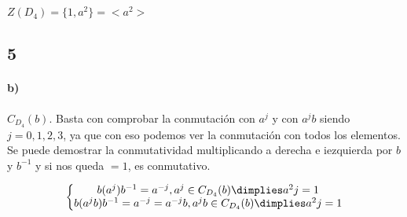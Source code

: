 \documentclass{apuntes}
\begin{document}
$Z(D_4) = \{1,a^2\} = <a^2>$
\subsection{5}

\paragraph{b)}
$C_{D_4}(b)$. Basta con comprobar la conmutación con $a^j$ y con $a^jb$ siendo $j = 0,1,2,3$, ya que con eso podemos ver la conmutación con todos los elementos. Se puede demostrar la conmutatividad multiplicando a derecha e iezquierda por $b$ y $b^{-1}$ y si nos queda $=1$, es conmutativo.

$$\left\{\begin{matrix}b(a^j)b^{-1} = a^{-j}, a^j \in C_{D_4}(b) \dimplies a^2j = 1\\
b(a^jb)b^{-1} = a^{-j} = a^{-j}b, a^jb \in C_{D_4}(b) \dimplies a^2j = 1\end{matrix}\right.$$
\end{document}
